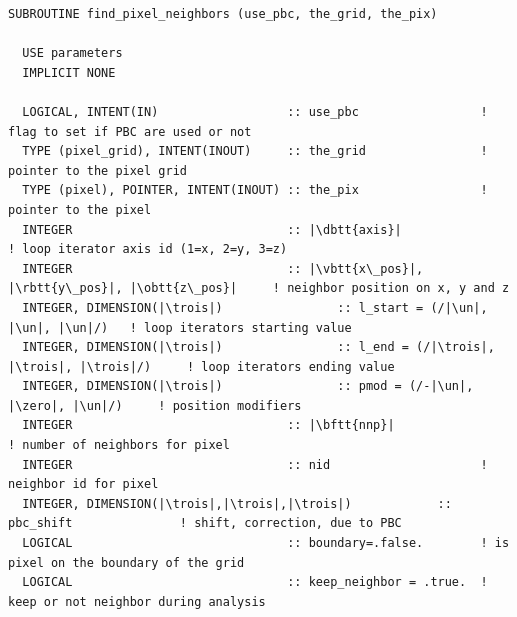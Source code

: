 \begin{lstlisting}[language={[90]FORTRAN}]
SUBROUTINE find_pixel_neighbors (use_pbc, the_grid, the_pix)
  
  USE parameters
  IMPLICIT NONE
  
  LOGICAL, INTENT(IN)                  :: use_pbc                 ! flag to set if PBC are used or not
  TYPE (pixel_grid), INTENT(INOUT)     :: the_grid                ! pointer to the pixel grid
  TYPE (pixel), POINTER, INTENT(INOUT) :: the_pix                 ! pointer to the pixel
  INTEGER                              :: |\dbtt{axis}|                    ! loop iterator axis id (1=x, 2=y, 3=z)
  INTEGER                              :: |\vbtt{x\_pos}|, |\rbtt{y\_pos}|, |\obtt{z\_pos}|     ! neighbor position on x, y and z
  INTEGER, DIMENSION(|\trois|)                :: l_start = (/|\un|, |\un|, |\un|/)   ! loop iterators starting value
  INTEGER, DIMENSION(|\trois|)                :: l_end = (/|\trois|, |\trois|, |\trois|/)     ! loop iterators ending value
  INTEGER, DIMENSION(|\trois|)                :: pmod = (/-|\un|, |\zero|, |\un|/)     ! position modifiers
  INTEGER                              :: |\bftt{nnp}|                     ! number of neighbors for pixel
  INTEGER                              :: nid                     ! neighbor id for pixel
  INTEGER, DIMENSION(|\trois|,|\trois|,|\trois|)            :: pbc_shift               ! shift, correction, due to PBC
  LOGICAL                              :: boundary=.false.        ! is pixel on the boundary of the grid
  LOGICAL                              :: keep_neighbor = .true.  ! keep or not neighbor during analysis
  

\end{lstlisting}
